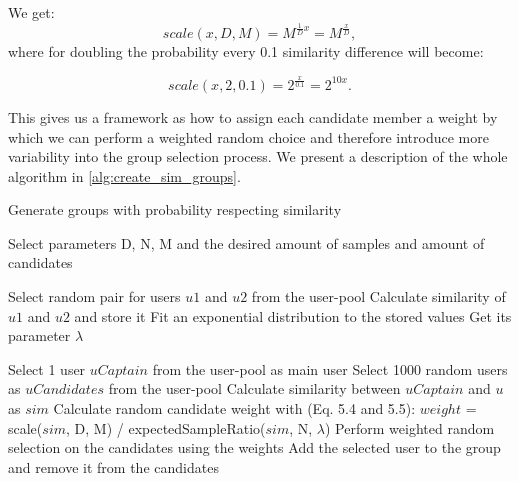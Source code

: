 We get:
\begin{equation}
    scale(x, D, M) = M^{\frac{1}{D}x} = M^{\frac{x}{D}},
\end{equation}
where for doubling the probability every 0.1 similarity difference will become:

\begin{equation}
    scale(x, 2, 0.1) = 2^{\frac{x}{0.1}} = 2^{10x}.
\end{equation}

This gives us a framework as how to assign each candidate member a weight by which we can perform a weighted random choice and therefore introduce more variability into the group selection process. We present a description of the whole algorithm in \ref{alg:create_sim_groups}.



\begin{algorithm}
	\caption{Generate groups with probability respecting similarity}
	\begin{algorithmic}[1]
	    \State Select parameters D, N, M and the desired amount of samples and amount of candidates
	
	    \vspace{3mm}
	
    	    \State Select random pair for users $u1$ and $u2$ from the user-pool
    	    \State Calculate similarity of $u1$ and $u2$ and store it
	    \EndFor
	    \State Fit an exponential distribution to the stored values
	    \State Get its parameter $\lambda$
	    
	    \vspace{3mm}
	    
    	    \State Select 1 user $uCaptain$ from the user-pool as main user
    	    \State Select 1000 random users as $uCandidates$ from the user-pool
    	        \State Calculate similarity between $uCaptain$ and $u$ as $sim$
    	        \State Calculate random candidate weight with (Eq. 5.4 and 5.5):
    	        \State $weight$ = scale($sim$, D, M) / expectedSampleRatio($sim$, N, $\lambda$)
    	    \EndFor
    	    \State Perform weighted random selection on the candidates using the weights
    	    \State Add the selected user to the group and remove it from the candidates
    	    \EndFor
        \EndFor
	\end{algorithmic}
	\label{alg:create_sim_groups}
\end{algorithm} 



